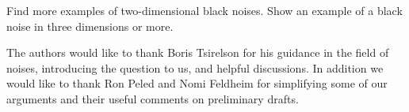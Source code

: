 {\begin{openproblem}
  Find more examples of two-dimensional black noises.  Show an example
  of a black noise in three dimensions or more.
\end{openproblem}


\label{sec:acknowledgements}

The authors would like to thank Boris Tsirelson for his guidance in
the field of noises, introducing the question to us, and helpful
discussions.  In addition we would like to thank Ron Peled and Nomi
Feldheim for simplifying some of our arguments and their useful
comments on preliminary drafts.
}
